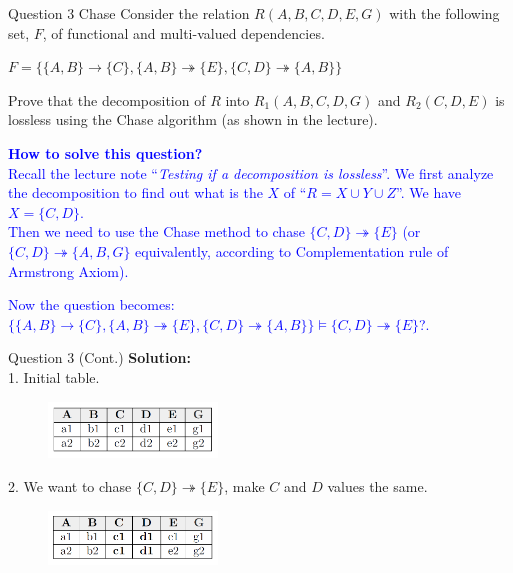 \begin{frame}[fragile]{Question 3 Chase}
Consider the relation $R(A,B,C,D,E,G)$ with the following set, $F$, of functional and multi-valued dependencies.\\ \vspace{5pt}
	
$F=\{\{A,B\}\rightarrow\{C\}, \{A,B\}\twoheadrightarrow\{E\},\{C,D\}\twoheadrightarrow\{A,B\}\}$\\ \vspace{5pt}
	
Prove that the decomposition of $R$ into $R_1(A,B,C,D,G)$ and $R_2(C,D,E)$ is lossless using the Chase algorithm (as shown in the lecture).\\ \vspace{5pt}

\textbf{\textcolor{blue}{How to solve this question?}}\\\vspace{5pt}
\textcolor{blue}{Recall the lecture note ``\emph{Testing if a decomposition is lossless}''.
We first analyze the decomposition to find out what is the $X$ of ``$R=X\cup Y\cup Z$''. We have $X=\{C,D\}$.\\\vspace{2pt}
Then we need to use the Chase method to chase $\{C,D\}\twoheadrightarrow\{E\}$ ({\small or $\{C,D\}\twoheadrightarrow\{A,B,G\}$ equivalently, according to Complementation rule of Armstrong Axiom}).}\\\vspace{5pt}

\textcolor{blue}{Now the question becomes:\\
$\{\{A,B\}\rightarrow\{C\}, \{A,B\}\twoheadrightarrow\{E\},\{C,D\}\twoheadrightarrow\{A,B\}\} \models \{C,D\}\twoheadrightarrow\{E\}$?.}
\end{frame}

\begin{frame}[fragile]{Question 3 (Cont.)}	
\textbf{Solution:}\\ \vspace{2pt}
1. Initial table.\\
\begin{figure}
	\includegraphics[width=0.4\textwidth, trim=0 0 0 0, clip]{4221-t5/images/3-1.png}
\end{figure}

2. We want to chase $\{C,D\} \twoheadrightarrow \{E\}$, make $C$ and $D$ values the same.\\
\begin{figure}
	\includegraphics[width=0.4\textwidth, trim=0 0 0 0, clip]{4221-t5/images/3-2.png}
\end{figure}

\end{frame}

